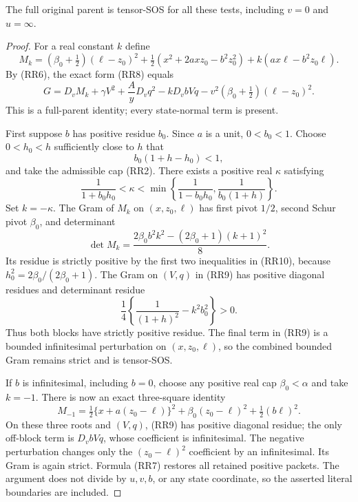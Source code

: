\begin{proposition}
The full original parent is tensor-SOS for all these tests, including
$v=0$ and $u=\infty$.
\end{proposition}
\begin{proof}
For a real constant $k$ define
\[
 M_k=(\beta_0+\tfrac12)(\ell-z_0)^2
 +\tfrac12(x^2+2axz_0-b^2z_0^2)
 +k(ax\ell-b^2z_0\ell).
\]
By (RR6), the exact form (RR8) equals
\[
 \boxed{G=D_vM_k+
 \gamma V^2+\frac AyD_vq^2-kD_vbVq
 -v^2(\beta_0+\tfrac12)(\ell-z_0)^2.}                   \tag{RR9}
\]
This is a full-parent identity; every state-normal term is present.

First suppose $b$ has positive residue $b_0$.  Since $a$ is a unit,
$0<b_0<1$.  Choose $0<h_0<h$ sufficiently close to $h$ that
\[
 b_0(1+h-h_0)<1,
\]
and take the admissible cap (RR2).  There exists a positive real
$\kappa$ satisfying
\[
 \frac1{1+b_0h_0}<\kappa<
 \min\left\{\frac1{1-b_0h_0},\frac1{b_0(1+h)}\right\}.
                                                               \tag{RR10}
\]
Set $k=-\kappa$.  The Gram of $M_k$ on $(x,z_0,\ell)$ has
first pivot $1/2$, second Schur pivot $\beta_0$, and determinant
\[
 \det M_k=\frac{2\beta_0 b^2k^2-(2\beta_0+1)(k+1)^2}{8}.
                                                               \tag{RR11}
\]
Its residue is strictly positive by the first two inequalities in
(RR10), because $h_0^2=2\beta_0/(2\beta_0+1)$.  The Gram on $(V,q)$
in (RR9) has positive diagonal residues and determinant residue
\[
 \frac14\left\{\frac1{(1+h)^2}-k^2b_0^2\right\}>0.       \tag{RR12}
\]
Thus both blocks have strictly positive residue.  The final term in
(RR9) is a bounded infinitesimal perturbation on $(x,z_0,\ell)$,
so the combined bounded Gram remains strict and is tensor-SOS.

If $b$ is infinitesimal, including $b=0$, choose any positive real
cap $\beta_0<\alpha$ and take $k=-1$.  There is now an exact
three-square identity
\[
 M_{-1}=\tfrac12\{x+a(z_0-\ell)\}^2
       +\beta_0(z_0-\ell)^2+\tfrac12(b\ell)^2.           \tag{RR13}
\]
On these three roots and $(V,q)$, (RR9) has positive diagonal
residue; the only off-block term is $D_vbVq$, whose coefficient
is infinitesimal.  The negative perturbation changes only the
$(z_0-\ell)^2$ coefficient by an infinitesimal.  Its Gram is again
strict.  Formula (RR7) restores all retained positive packets.
The argument does not divide by $u,v,b$, or any state coordinate,
so the asserted literal boundaries are included.
\end{proof}

